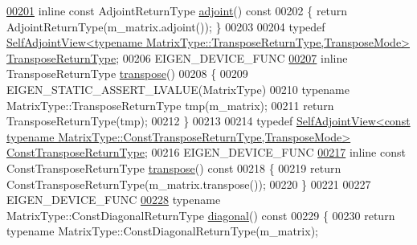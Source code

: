 \begin{DoxyCode}
\hyperlink{group___core___module_a2c19217199aaec1dc208f0e3f437dae6}{00201}     \textcolor{keyword}{inline} \textcolor{keyword}{const} AdjointReturnType \hyperlink{group___core___module_a2c19217199aaec1dc208f0e3f437dae6}{adjoint}()\textcolor{keyword}{ const}
00202 \textcolor{keyword}{    }\{ \textcolor{keywordflow}{return} AdjointReturnType(m\_matrix.adjoint()); \}
00203 
00204     \textcolor{keyword}{typedef} 
      \hyperlink{group___core___module_class_eigen_1_1_self_adjoint_view}{SelfAdjointView<typename MatrixType::TransposeReturnType,TransposeMode>}
       \hyperlink{group___core___module_class_eigen_1_1_self_adjoint_view}{TransposeReturnType};
00206     EIGEN\_DEVICE\_FUNC
\hyperlink{group___core___module_abdff2b280dd18dfbe1ca99338b381870}{00207}     \textcolor{keyword}{inline} TransposeReturnType \hyperlink{group___core___module_abdff2b280dd18dfbe1ca99338b381870}{transpose}()
00208     \{
00209       EIGEN\_STATIC\_ASSERT\_LVALUE(MatrixType)
00210       \textcolor{keyword}{typename} MatrixType::TransposeReturnType tmp(m\_matrix);
00211       \textcolor{keywordflow}{return} TransposeReturnType(tmp);
00212     \}
00213 
00214     \textcolor{keyword}{typedef} 
      \hyperlink{group___core___module_class_eigen_1_1_self_adjoint_view}{SelfAdjointView<const typename MatrixType::ConstTransposeReturnType,TransposeMode>}
       \hyperlink{group___core___module_class_eigen_1_1_self_adjoint_view}{ConstTransposeReturnType};
00216     EIGEN\_DEVICE\_FUNC
\hyperlink{group___core___module_aa1304047233ca6b8c9ee87c025edccc9}{00217}     \textcolor{keyword}{inline} \textcolor{keyword}{const} ConstTransposeReturnType \hyperlink{group___core___module_aa1304047233ca6b8c9ee87c025edccc9}{transpose}()\textcolor{keyword}{ const}
00218 \textcolor{keyword}{    }\{
00219       \textcolor{keywordflow}{return} ConstTransposeReturnType(m\_matrix.transpose());
00220     \}
00221 
00227     EIGEN\_DEVICE\_FUNC
\hyperlink{group___core___module_abe2f0e6cbade78463ff973178947db98}{00228}     \textcolor{keyword}{typename} MatrixType::ConstDiagonalReturnType \hyperlink{group___core___module_abe2f0e6cbade78463ff973178947db98}{diagonal}()\textcolor{keyword}{ const}
00229 \textcolor{keyword}{    }\{
00230       \textcolor{keywordflow}{return} \textcolor{keyword}{typename} MatrixType::ConstDiagonalReturnType(m\_matrix);

\end{DoxyCode}
